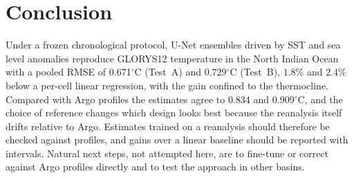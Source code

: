 \section{Conclusion}
\label{sec:conclusion}
Under a frozen chronological protocol, U-Net ensembles driven by SST and sea level anomalies reproduce GLORYS12 temperature in the North Indian Ocean with a pooled RMSE of 0.671$^\circ$C (Test~A) and 0.729$^\circ$C (Test~B), $1.8\%$ and $2.4\%$ below a per-cell linear regression, with the gain confined to the thermocline. Compared with Argo profiles the estimates agree to 0.834 and 0.909$^\circ$C, and the choice of reference changes which design looks best because the reanalysis itself drifts relative to Argo. Estimates trained on a reanalysis should therefore be checked against profiles, and gains over a linear baseline should be reported with intervals. Natural next steps, not attempted here, are to fine-tune or correct against Argo profiles directly and to test the approach in other basins.
